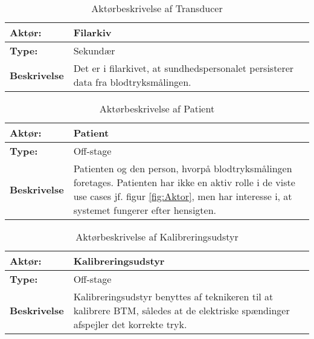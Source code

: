 \begin{table}[H]
\begin{center}
\begin{tabular} {| p{6cm} | p{9cm} |}
\hline
\textbf{Aktør:} & Filarkiv \\ \hline
\textbf{Type:} & Sekundær \\ \hline
\textbf{Beskrivelse} & 
Det er i filarkivet, at sundhedspersonalet persisterer data fra blodtryksmålingen.
 \\ \hline
\end{tabular}
\end{center}
\caption{Aktørbeskrivelse af Transducer}
\label{tb:AktorbeskrivelseFA}
\end{table}



\begin{table}[H]
\begin{center}
\begin{tabular} {| p{6cm} | p{9cm} |}
\hline
\textbf{Aktør:} & Patient \\ \hline
\textbf{Type:} & Off-stage \\ \hline
\textbf{Beskrivelse} & 
Patienten og den person, hvorpå blodtryksmålingen foretages. Patienten har ikke en aktiv rolle i de viste use cases jf. figur \ref{fig:Aktor}, men har interesse i, at systemet fungerer efter hensigten.
 \\ \hline
\end{tabular}
\end{center}
\caption{Aktørbeskrivelse af Patient}
\label{tb:AktorbeskrivelsePA}
\end{table}


\begin{table}[H]
\begin{center}
\begin{tabular} {| p{6cm} | p{9cm} |}
\hline
\textbf{Aktør:} & Kalibreringsudstyr \\ \hline
\textbf{Type:} & Off-stage \\ \hline
\textbf{Beskrivelse} & 
Kalibreringsudstyr benyttes af teknikeren til at kalibrere BTM, således at de elektriske spændinger afspejler det korrekte tryk.
 \\ \hline
\end{tabular}
\end{center}
\caption{Aktørbeskrivelse af Kalibreringsudstyr}
\label{tb:AktorbeskrivelsePA}
\end{table}